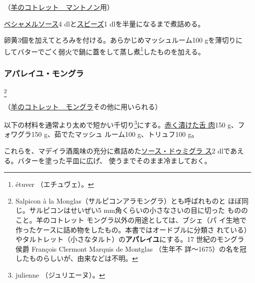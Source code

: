 \begin{recette}
（\protect\hyperlink{cotelettes-maintenon}{羊のコトレット　マントノン}用）

\protect\hyperlink{sauce-bechamel}{ベシャメルソース}4
dlと\protect\hyperlink{sauce-soubise}{スビーズ}1
dlを半量になるまで煮詰める。

卵黄3個を加えてとろみを付ける。あらかじめマッシュルーム100 gを薄切りに
してバターでごく弱火で鍋に蓋をして蒸し煮\footnote{étuver
  （エチュヴェ）。}したものを加える。

\maeaki

\hypertarget{appareil-montglas}{%
\subsubsection{アパレイユ・モングラ}\label{appareil-montglas}}

\footnote{Salpicon à la
  Monglas（サルピコンアラモングラ）とも呼ばれものと
  ほぼ同じ。サルピコンはせいぜい5 mm角くらいの小さなさいの目に切った
  もののこと。羊のコトレット モングラ以外の用途としては、ブシェ（パ
  イ生地で作ったケースに詰め物をしたもの。本書ではオードブルに分類さ
  れている）やタルトレット（小さなタルト）の\textbf{アパレイユ}にする。17
  世紀のモングラ侯爵 François Clermont Marquis de Montglas （生年不
  詳〜1675）の名を冠したものらしいが、由来などは不明。}


（\protect\hyperlink{cotelettes-monglas}{羊のコトレット　モングラ}その他に用いられる）

以下の材料を通常より太めで短かい千切り\footnote{julienne
  （ジュリエーヌ）。}にする。\protect\hyperlink{saumure-liquide-pour-langues}{赤く漬けた舌
肉}150 g、フォワグラ150 g、茹でたマッシュ ルーム100 g、トリュフ100 g。

これらを、マデイラ酒風味の充分に煮詰めた\protect\hyperlink{sauce-demi-glace}{ソース・ドゥミグラ
ス}2\undemi{} dlであえる。バターを塗った平皿に広げ、
使うまでそのまま冷ましておく。

\maeaki

\hypertarget{appareil-provencal}{%
}
\end{recette}
